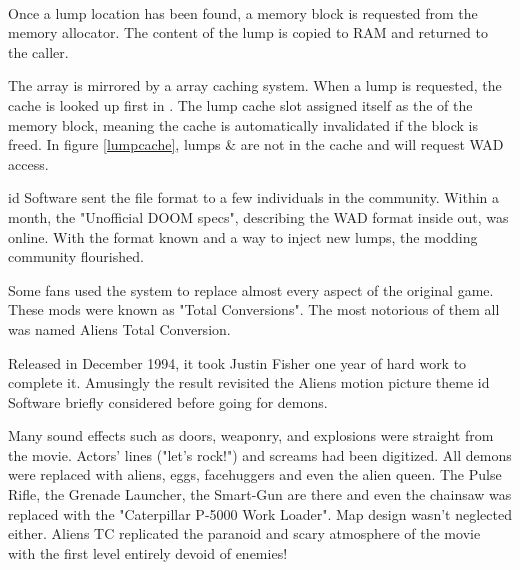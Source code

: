 \par
{}\\
\par
Once a lump location has been found, a memory block is requested from the memory allocator. The content of the lump is copied to RAM and returned to the caller. \\
\par
The  array is mirrored by a  array caching system. When a lump is requested, the cache is looked up first in . The lump cache slot assigned itself as the  of the memory block, meaning the cache is automatically invalidated if the block is freed. In figure \ref{lumpcache}, lumps  \&  are not in the cache and will request WAD access.\\
\par
{}
\par
{}


id Software sent the file format to a few individuals in the community. Within a month, the "Unofficial DOOM specs", describing the WAD format inside out, was online. With the format known and a way to inject new lumps, the modding community flourished.\\
\par

Some fans used the system to replace almost every aspect of the original game. These mods were known as "Total Conversions". The most notorious of them all was named Aliens Total Conversion.\\
\par
Released in December 1994, it took Justin Fisher one year of hard work to complete it. Amusingly the result revisited the Aliens motion picture theme id Software briefly considered before going for demons.\\
\par
 \par
 Many sound effects such as doors, weaponry, and explosions were straight from the movie. Actors' lines ("let's rock!") and screams had been digitized. All demons were replaced with aliens, eggs, facehuggers and even the alien queen. The Pulse Rifle, the Grenade Launcher, the Smart-Gun are there and even the chainsaw was replaced with the "Caterpillar P-5000 Work Loader". Map design wasn't neglected either. Aliens TC replicated the paranoid and scary atmosphere of the movie with the first level entirely devoid of enemies!
